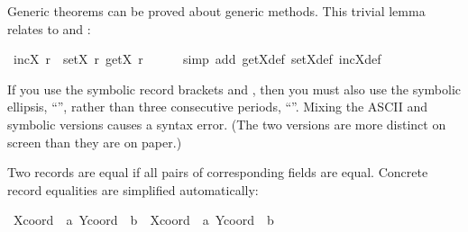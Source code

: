\begin{isabellebody}
\begin{isamarkuptext}%
Generic theorems can be proved about generic methods.  This trivial
  lemma relates  to  and :%
\end{isamarkuptext}%
\isamarkuptrue%
\isamarkupfalse%
\ {}incX\ r\ {}\ setX\ r\ {}getX\ r\ {}\ {}{}{}\isanewline
%
\isadelimproof
\ \ %
\endisadelimproof
%
\isatagproof
{}\isamarkupfalse%
\ {}simp\ add{}\ getX{}def\ setX{}def\ incX{}def{}%
\endisatagproof
{\isafoldproof}%
%
\isadelimproof
%
\endisadelimproof
%
\begin{isamarkuptext}%
\begin{warn}
  If you use the symbolic record brackets  and ,
  then you must also use the symbolic ellipsis, ``'', rather
  than three consecutive periods, ``''.  Mixing the ASCII
  and symbolic versions causes a syntax error.  (The two versions are
  more distinct on screen than they are on paper.)
  \end{warn}%
\end{isamarkuptext}%
\isamarkuptrue%
%
\isamarkuptrue%
%
\begin{isamarkuptext}%
Two records are equal if all pairs of
  corresponding fields are equal.  Concrete record equalities are
  simplified automatically:%
\end{isamarkuptext}%
\isamarkuptrue%
\isamarkupfalse%
\ {}{}{}Xcoord\ {}\ a{}\ Ycoord\ {}\ b{}\ {}\ {}Xcoord\ {}\ a{}{}\ Ycoord\ {}\ b{}{}{}\ {}\isanewline

\end{isabellebody}
